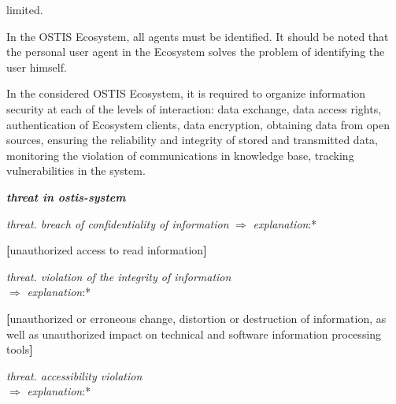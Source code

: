 \documentclass{article}
\begin{document}
\begin{multicols}{2}
limited.
    \par 
In the OSTIS Ecosystem, all agents must be identified.
It should be noted that the personal user agent in the
Ecosystem solves the problem of identifying the user
himself.
    \par
    In the considered OSTIS Ecosystem, it is required to
organize information security at each of the levels of
interaction: data exchange, data access rights, authentication of Ecosystem clients, data encryption, obtaining
data from open sources, ensuring the reliability and
integrity of stored and transmitted data, monitoring the
violation of communications in knowledge base, tracking
vulnerabilities in the system.
\vspace{0.7cm}
\par
\noindent \textit{\textbf{threat in ostis-system}}
 \begin{description}[leftmargin=!, labelwidth=1cm, itemsep=-1.5mm]
   \item[$\supset$] \textit {threat. breach of confidentiality of information}
   \hspace{0.5cm} $\Rightarrow$  \hspace{0.5cm} \textit{explanation}:* 
   \par \vspace{-0.1cm} \hspace{1cm} \textbf{[}unauthorized access to read information\textbf{]}
    \item[$\supset$] \textit {threat. violation of the integrity of information} \\
   \vspace{0.1cm} \hspace{-0.23cm}  $\Rightarrow$  \hspace{0.5cm} \textit{explanation}:* 
     \par
      \begin{description}[leftmargin=!, labelwidth=1cm, itemsep=-1.5mm]
     \item[ ] \vspace{-0.4cm} \textbf{[}unauthorized or erroneous change, distortion or destruction of information, as well
as unauthorized impact on technical and
software information processing tools\textbf{]}
\end{description}
 \item[$\supset$] \vspace{-0.2cm} \textit {threat. accessibility violation} \\
   \vspace{0.1cm} \hspace{-0.23cm}  $\Rightarrow$  \hspace{0.5cm} \textit{explanation}:* 

\end{description}
\end{multicols}
\end{document}
